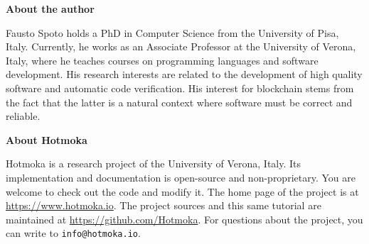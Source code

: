 \newpage

\pagestyle{empty}

\nbvspace[1]
\normalsize

\textbf{About the author}

Fausto Spoto holds a PhD in Computer Science from the University of Pisa, Italy.
Currently, he works as an Associate Professor at the University of Verona, Italy, where
he teaches courses on programming languages and software development.
His research interests are related to the development of high quality software
and automatic code verification. His interest for blockchain stems
from the fact that the latter is a natural context where
software must be correct and reliable.

\nbvspace[1]

\textbf{About Hotmoka}

Hotmoka is a research project of the University of Verona, Italy.
Its implementation and documentation is open-source and
non-proprietary. You are welcome to check out the code and modify it.
The home page of the project is at \url{https://www.hotmoka.io}.
The project sources and this same tutorial
are maintained at \url{https://github.com/Hotmoka}.
For questions about the project, you can write to \texttt{info@hotmoka.io}.
